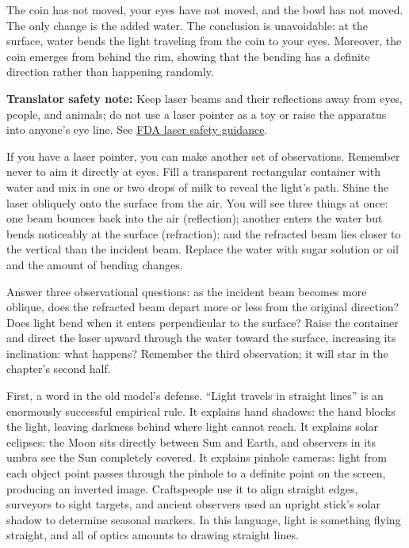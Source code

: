 The coin has not moved, your eyes have not moved, and the bowl has not moved. The only change is the added water. The conclusion is unavoidable: at the surface, water bends the light traveling from the coin to your eyes. Moreover, the coin emerges from behind the rim, showing that the bending has a definite direction rather than happening randomly.

\textbf{Translator safety note:} Keep laser beams and their reflections away from eyes, people, and animals; do not use a laser pointer as a toy or raise the apparatus into anyone's eye line. See \href{https://www.fda.gov/consumers/consumer-updates/laser-toys-how-keep-kids-safe}{FDA laser safety guidance}.

If you have a laser pointer, you can make another set of observations. Remember never to aim it directly at eyes. Fill a transparent rectangular container with water and mix in one or two drops of milk to reveal the light's path. Shine the laser obliquely onto the surface from the air. You will see three things at once: one beam bounces back into the air (reflection); another enters the water but bends noticeably at the surface (refraction); and the refracted beam lies closer to the vertical than the incident beam. Replace the water with sugar solution or oil and the amount of bending changes.

Answer three observational questions: as the incident beam becomes more oblique, does the refracted beam depart more or less from the original direction? Does light bend when it enters perpendicular to the surface? Raise the container and direct the laser upward through the water toward the surface, increasing its inclination: what happens? Remember the third observation; it will star in the chapter's second half.


First, a word in the old model's defense. ``Light travels in straight lines'' is an enormously successful empirical rule. It explains hand shadows: the hand blocks the light, leaving darkness behind where light cannot reach. It explains solar eclipses: the Moon sits directly between Sun and Earth, and observers in its umbra see the Sun completely covered. It explains pinhole cameras: light from each object point passes through the pinhole to a definite point on the screen, producing an inverted image. Craftspeople use it to align straight edges, surveyors to sight targets, and ancient observers used an upright stick's solar shadow to determine seasonal markers. In this language, light is something flying straight, and all of optics amounts to drawing straight lines.

